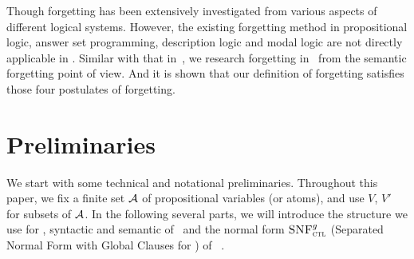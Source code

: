 \documentclass[letterpaper]{article} %
\begin{document}
Though forgetting has been extensively investigated from various aspects of different logical systems.
However, the existing forgetting method in propositional
logic, answer set programming, description logic and modal logic are not directly applicable in \CTL.
Similar with that in~\cite{Yan:AIJ:2009}, we research forgetting in \CTL\ from the semantic forgetting point of view.
And it is shown that our definition of forgetting satisfies those four postulates of forgetting.
%
%
\section{Preliminaries}
We start with some technical and notational preliminaries. Throughout this paper, we fix a finite set ${\cal A}$ of propositional variables (or atoms), and use $V$, $V'$ for subsets of ${\cal A}$. In the following several parts, we will introduce the structure we use for \CTL, syntactic and semantic of \CTL\ and the normal form ${\textsc{SNF}_{\textsc{ctl}}^g}$ (Separated Normal Form with Global Clauses for \CTL) of \CTL~\cite{zhang2009refined}.
\end{document}
